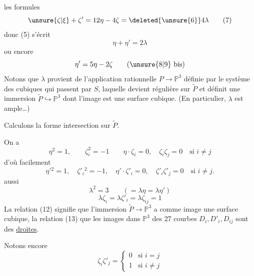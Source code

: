 les formules
\[
\unsure{\zeta|\xi}+\zeta'=12\eta-4\zeta=\deleted{\unsure{6}}4\lambda\tag*{(7)}
\]
donc (5) s'écrit  
\[
\eta+\eta'=2\lambda\tag*{(8)}
\]
ou encore
\[
\eta'=5\eta-2\zeta\tag*{(\unsure{8|9} bis)}
\]
Notons que $\lambda$ provient de l'application rationnelle $P\longrightarrow\mathbb P^3$ définie par le système des cubiques qui passent par $S$, laquelle devient régulière sur $\widetilde P$ et définit une immersion $\widetilde P\hookrightarrow\mathbb P^3$ dont l'image est une surface cubique. (En particulier, $\lambda$ est ample\ldots) 


Calculons la forme intersection sur $\widetilde P$.

On a
\[
\eta^2=1,\qquad \zeta_i^2=-1\qquad \eta\cdot\zeta_i=0,\quad\zeta_i\zeta_j=0\quad\text{si }i\ne j\tag*{(10)}
\]
d'où facilement
\[
\eta'{}^2=1,\quad\zeta'_i{}^2=-1,\quad\eta'\cdot\zeta'_i=0,\quad\zeta'_i\zeta'_j=0\quad\text{si }i\ne j.\tag*{(11)}
\]
 aussi
\[
\lambda^2=3\qquad(=\lambda\eta=\lambda\eta')\tag*{(12)}
\]
\[
\lambda\zeta_i=\lambda\zeta'_i=\lambda\zeta_{ij}=1\tag*{(13)}
\]
La relation (12) signifie que l'immersion $\widetilde P\longrightarrow\mathbb P^3$ a comme image une surface cubique, la relation (13) que les images dans $\mathbb P^3$ des 27  courbes $D_i,D'_i,D_{ij}$ sont des \uline{droites}.

Notons encore
\[
\zeta_i\zeta'_j=\begin{cases}0&\text{si }i=j\\1&\text{si }i\ne j\end{cases}\tag*{(14)}
\]
\unsure{(}
